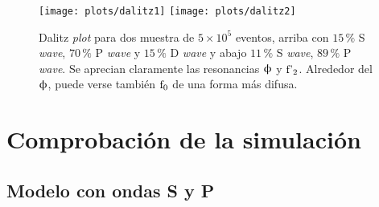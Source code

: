 \begin{figure}[H]
\centering
\texttt{[image: plots/dalitz1]}
\texttt{[image: plots/dalitz2]}
\caption{Dalitz \textit{plot} para dos muestra de $5\times 10^5$ eventos, arriba con $15\,\%$ S \emph{wave}, $70\,\%$ P \emph{wave} y $15\,\%$ D \emph{wave} y abajo $11\,\%$ S \emph{wave}, $89\,\%$ P \emph{wave}. Se aprecian claramente las resonancias $\upphi$ y $\text{f'}_2$. Alrededor del $\upphi$, puede verse también $\text{f}_0$ de una forma más difusa.}   \label{fig_evtgensamples2}
\end{figure}





\section{Comprobación de la simulación}



\subsection{Modelo con ondas S y P}

